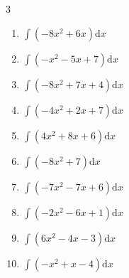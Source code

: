 \begin{multicols}{3}
\begin{enumerate}
\columnbreak %

\resetques

  \item $\displaystyle \int \left( -8x^{2}+6x \right) \mathrm{d}x$


  \item $\displaystyle \int \left( -x^{2}-5x+7 \right) \mathrm{d}x$


  \item $\displaystyle \int \left( -8x^{2}+7x+4 \right) \mathrm{d}x$


  \item $\displaystyle \int \left( -4x^{2}+2x+7 \right) \mathrm{d}x$


  \item $\displaystyle \int \left( 4x^{2}+8x+6 \right) \mathrm{d}x$


  \item $\displaystyle \int \left( -8x^{2}+7 \right) \mathrm{d}x$


  \item $\displaystyle \int \left( -7x^{2}-7x+6 \right) \mathrm{d}x$


  \item $\displaystyle \int \left( -2x^{2}-6x+1 \right) \mathrm{d}x$


  \item $\displaystyle \int \left( 6x^{2}-4x-3 \right) \mathrm{d}x$


  \item $\displaystyle \int \left( -x^{2}+x-4 \right) \mathrm{d}x$



\end{enumerate}
\end{multicols}
